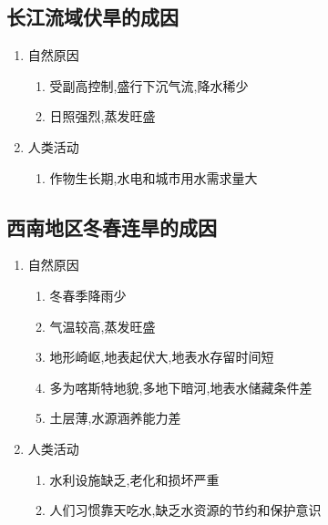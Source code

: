 \documentclass[a4paper]{article}
\begin{document}
    \subsection{长江流域伏旱的成因}
    \begin{enumerate}
        \item 自然原因
        \begin{enumerate}
            \item 受副高控制,盛行下沉气流,降水稀少
            \item 日照强烈,蒸发旺盛
        \end{enumerate}
        \item 人类活动
        \begin{enumerate}
            \item 作物生长期,水电和城市用水需求量大
        \end{enumerate}
    \end{enumerate}
    \subsection{西南地区冬春连旱的成因}
    \begin{enumerate}
        \item 自然原因
        \begin{enumerate}
            \item 冬春季降雨少
            \item 气温较高,蒸发旺盛
            \item 地形崎岖,地表起伏大,地表水存留时间短
            \item 多为喀斯特地貌,多地下暗河,地表水储藏条件差
            \item 土层薄,水源涵养能力差
        \end{enumerate}
        \item 人类活动
        \begin{enumerate}
            \item 水利设施缺乏,老化和损坏严重
            \item 人们习惯靠天吃水,缺乏水资源的节约和保护意识
        \end{enumerate}
    \end{enumerate}
\end{document}
